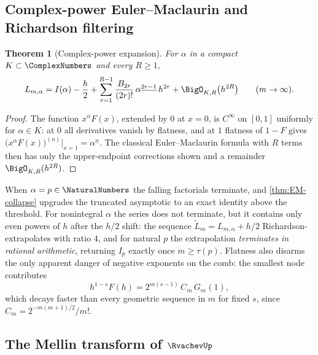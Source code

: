 \documentclass[11pt,oneside]{article}
\numberwithin{equation}{section}
\newtheorem{theorem}{Theorem}[section]
\theoremstyle{definition}
\theoremstyle{remark}
\newcommand{\fall}[2]{#1^{\underline{#2}}}
\begin{document}
\subsection{Complex-power Euler--Maclaurin and Richardson filtering}

\begin{theorem}[Complex-power expansion]
\label{thm:complex-EM}
For $\alpha$ in a compact $K\subset\ComplexNumbers$ and every $R\ge1$,
\begin{equation}
 L_{m,\alpha}
 =I(\alpha)-\frac h2
 +\sum_{r=1}^{R-1}\frac{B_{2r}}{(2r)!}\,
 \fall{\alpha}{2r-1}\,h^{2r}
 +\BigO_{K,R}\bigl(h^{2R}\bigr)
 \qquad(m\to\infty).
 \label{eq:complex-EM}
\end{equation}
\end{theorem}

\begin{proof}
The function $x^{\alpha}F(x)$, extended by $0$ at $x=0$, is
$C^\infty$ on $[0,1]$ uniformly for $\alpha\in K$: at $0$ all
derivatives vanish by flatness, and at $1$ flatness of $1-F$ gives
$\bigl(x^{\alpha}F(x)\bigr)^{(n)}\bigl|_{x=1}=\fall\alpha n$.  The
classical Euler--Maclaurin formula with $R$ terms then has only the
upper-endpoint corrections shown and a remainder
$\BigO_{K,R}(h^{2R})$.
\end{proof}

When $\alpha=p\in\NaturalNumbers$ the falling factorials terminate, and
\cref{thm:EM-collapse} upgrades the truncated asymptotic to an exact
identity above the threshold.  For nonintegral $\alpha$ the series
does not terminate, but it contains only even powers of $h$ after the
$h/2$ shift: the sequence
$\widetilde L_m=L_{m,\alpha}+h/2$ Richardson-extrapolates with ratio
$4$, and for natural $p$ the extrapolation \emph{terminates in
rational arithmetic}, returning $I_p$ exactly once $m\ge\tau(p)$.
Flatness also disarms the only apparent danger of negative exponents
on the comb: the smallest node contributes
\begin{equation}
 h^{1-s}F(h)
 =2^{m(s-1)}\,C_m\,G_m(1),
 \label{eq:first-node}
\end{equation}
which decays faster than every geometric sequence in $m$ for fixed
$s$, since $C_m=2^{-m(m+1)/2}/m!$.

\subsection{The Mellin transform of \texorpdfstring{$\RvachevUp$}{up}}
\label{sec:mellin-up}
\end{document}
